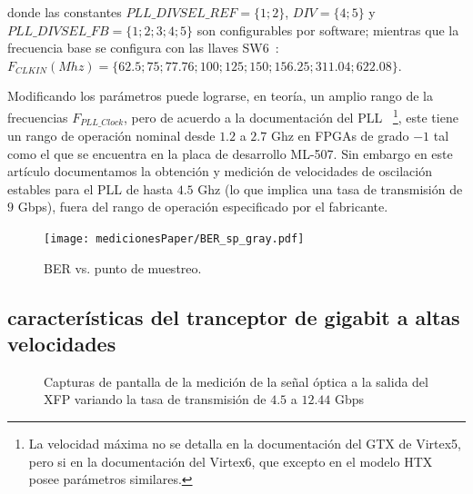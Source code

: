 donde las constantes $PLL\_DIVSEL\_REF = \{1;2\}$, $DIV = \{4;5\} $ y
$PLL\_DIVSEL\_FB = \{1;2;3;4;5\}$ son configurables por software;
mientras que la frecuencia base se configura con las llaves
SW6~\cite[Tabla 1-32]{ug347}: $
F_{CLKIN} (Mhz)= \{62.5;75;77.76;100;125;150;156.25;311.04;622.08\}$.


 Modificando los parámetros puede lograrse, en teoría, un amplio rango
de la frecuencias $F_{PLL\_Clock}$, pero de acuerdo a la documentación
del PLL \cite[Pág. 71]{ug366}~\footnote{La velocidad máxima no se
detalla en la documentación del GTX de Virtex5, pero si en la
documentación del Virtex6, que excepto en el modelo HTX posee parámetros
similares.}, este tiene un rango de operación nominal desde $1.2$ a
$2.7$ Ghz en FPGAs de grado $-1$ tal como el que se encuentra en la
placa de desarrollo ML-507. Sin embargo en este artículo documentamos la
obtención y medición de velocidades de oscilación estables para el PLL
de hasta $4.5$ Ghz (lo que implica una tasa de transmisión de $9$ Gbps),
fuera del rango de operación especificado por el fabricante.

\begin{figure}[t]
  \centering
    \texttt{[image: medicionesPaper/BER\_sp\_gray.pdf]}
\caption {BER vs. punto de muestreo.}
\label{fig:BERvsSamplingPoint}
\end{figure}

\subsection{características del tranceptor de gigabit a altas velocidades}


\begin{figure}[!t]
   \centering
   \qquad
   \qquad
   \qquad
   \qquad
   \qquad
  \caption {Capturas de pantalla de la medición de la señal óptica a la salida del XFP variando la tasa de transmisión de $4.5$ a $12.44$ Gbps}
  \label{fig:ImgTasa}
\end{figure}





